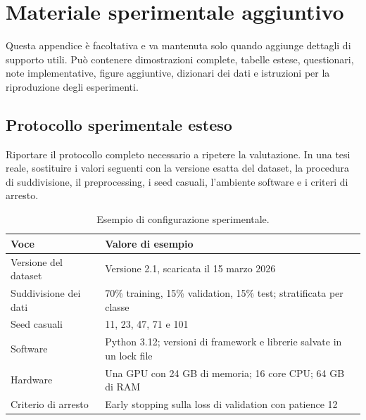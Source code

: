 
\chapter{Materiale sperimentale aggiuntivo}\label{app:additional-material}

\begin{keypoint}
Questa appendice \`e facoltativa e va mantenuta solo quando aggiunge dettagli
di supporto utili. Pu\`o contenere dimostrazioni complete, tabelle estese,
questionari, note implementative, figure aggiuntive, dizionari dei dati e
istruzioni per la riproduzione degli esperimenti.
\end{keypoint}

\section{Protocollo sperimentale esteso}
Riportare il protocollo completo necessario a ripetere la valutazione. In una
tesi reale, sostituire i valori seguenti con la versione esatta del dataset, la
procedura di suddivisione, il preprocessing, i seed casuali, l'ambiente software
e i criteri di arresto.

\begin{table}[htbp]
\centering
\caption{Esempio di configurazione sperimentale.}
\label{tab:appendix-config}
\begin{tabularx}{\textwidth}{lY}
\toprule
Voce & Valore di esempio\\
\midrule
Versione del dataset & Versione 2.1, scaricata il 15 marzo 2026\\
Suddivisione dei dati & 70\% training, 15\% validation, 15\% test; stratificata per classe\\
Seed casuali & 11, 23, 47, 71 e 101\\
Software & Python 3.12; versioni di framework e librerie salvate in un lock file\\
Hardware & Una GPU con 24 GB di memoria; 16 core CPU; 64 GB di RAM\\
Criterio di arresto & Early stopping sulla loss di validation con patience 12\\
\bottomrule
\end{tabularx}
\end{table}

